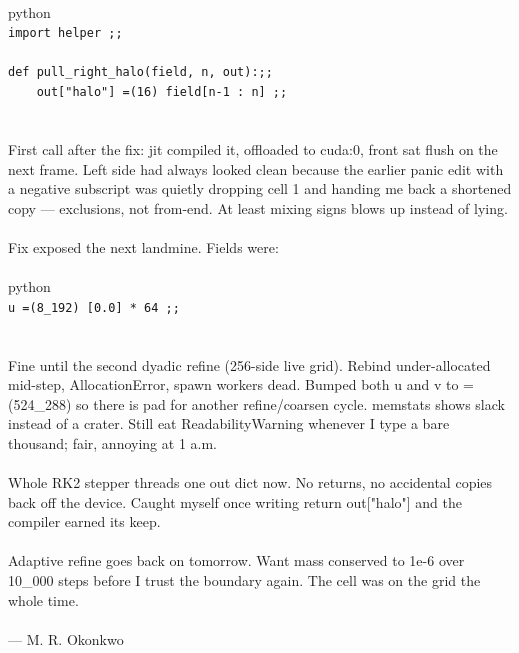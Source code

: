 \begin{exbox}
{  \  \\
  \textasciigrave{}\textasciigrave{}\textasciigrave{}python \\
  \textup{\texttt{import helper ;;}} \\
  \  \\
  \textup{\texttt{def pull\_right\_halo(field, n, out):;;}} \\
  \textup{\texttt{~~~~out["halo"] =(16) field[n-1 : n] ;;}} \\
  \textasciigrave{}\textasciigrave{}\textasciigrave{} \\
  \  \\
  First call after the fix: jit compiled it, offloaded to cuda:0, front sat flush on the next frame. Left side had always looked clean because the earlier panic edit with a negative subscript was quietly dropping cell 1 and handing me back a shortened copy --- exclusions, not from-end. At least mixing signs blows up instead of lying. \\
  \  \\
  Fix exposed the next landmine. Fields were: \\
  \  \\
  \textasciigrave{}\textasciigrave{}\textasciigrave{}python \\
  \textup{\texttt{u =(8\_192) [0.0] * 64 ;;}} \\
  \textasciigrave{}\textasciigrave{}\textasciigrave{} \\
  \  \\
  Fine until the second dyadic refine (256-side live grid). Rebind under-allocated mid-step, AllocationError, spawn workers dead. Bumped both u and v to =(524\_288) so there is pad for another refine/coarsen cycle. memstats shows slack instead of a crater. Still eat ReadabilityWarning whenever I type a bare thousand; fair, annoying at 1 a.m. \\
  \  \\
  Whole RK2 stepper threads one out dict now. No returns, no accidental copies back off the device. Caught myself once writing return out["halo"] and the compiler earned its keep. \\
  \  \\
  Adaptive refine goes back on tomorrow. Want mass conserved to 1e-6 over 10\_000 steps before I trust the boundary again. The cell was on the grid the whole time. \\
  \  \\
  --- M. R. Okonkwo}
\end{exbox}
